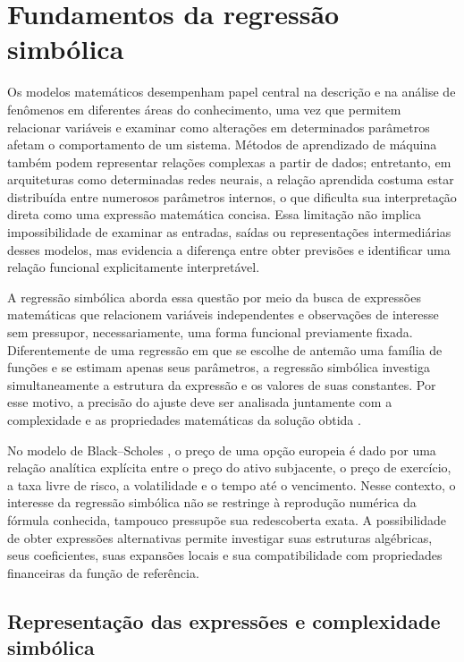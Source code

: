\section{Fundamentos da regressão simbólica}
\label{sec:fundamentos_regressao_simbolica}

Os modelos matemáticos desempenham papel central na descrição e na análise de fenômenos em diferentes áreas do conhecimento, uma vez que permitem relacionar variáveis e examinar como alterações em determinados parâmetros afetam o comportamento de um sistema. Métodos de aprendizado de máquina também podem representar relações complexas a partir de dados; entretanto, em arquiteturas como determinadas redes neurais, a relação aprendida costuma estar distribuída entre numerosos parâmetros internos, o que dificulta sua interpretação direta como uma expressão matemática concisa. Essa limitação não implica impossibilidade de examinar as entradas, saídas ou representações intermediárias desses modelos, mas evidencia a diferença entre obter previsões e identificar uma relação funcional explicitamente interpretável.

A regressão simbólica aborda essa questão por meio da busca de expressões matemáticas que relacionem variáveis independentes e observações de interesse sem pressupor, necessariamente, uma forma funcional previamente fixada. Diferentemente de uma regressão em que se escolhe de antemão uma família de funções e se estimam apenas seus parâmetros, a regressão simbólica investiga simultaneamente a estrutura da expressão e os valores de suas constantes. Por esse motivo, a precisão do ajuste deve ser analisada juntamente com a complexidade e as propriedades matemáticas da solução obtida \cite{makke2024interpretable,cranmer2023pysr}.

No modelo de Black--Scholes \cite{blackscholes1973}, o preço de uma opção europeia é dado por uma relação analítica explícita entre o preço do ativo subjacente, o preço de exercício, a taxa livre de risco, a volatilidade e o tempo até o vencimento. Nesse contexto, o interesse da regressão simbólica não se restringe à reprodução numérica da fórmula conhecida, tampouco pressupõe sua redescoberta exata. A possibilidade de obter expressões alternativas permite investigar suas estruturas algébricas, seus coeficientes, suas expansões locais e sua compatibilidade com propriedades financeiras da função de referência.

\subsection{Representação das expressões e complexidade simbólica}
\label{subsec:sr_representacao}

